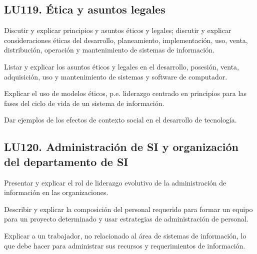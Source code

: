 \subsection{LU119. Ética y asuntos legales}\label{sec:BOK-LU119}\label{sec:LU119}
\begin{LearningUnit}
\begin{LUGoal}
\item Discutir y explicar principios y asuntos éticos y legales; discutir y explicar consideraciones éticas del desarrollo, planeamiento, implementación, uso, venta, distribución, operación y mantenimiento de sistemas de información.
\end{LUGoal}

\begin{LUObjective}
\item Listar y explicar los asuntos éticos y legales en el desarrollo, posesión, venta, adquisición, uso y mantenimiento de sistemas y software de computador.
\item Explicar el uso de modelos éticos, p.e. liderazgo centrado en principios para las fases del ciclo de vida de un sistema de información.
\item Dar ejemplos de los efectos de contexto social en el desarrollo de tecnología.
\end{LUObjective}
\end{LearningUnit}

\subsection{LU120. Administración de SI y organización del departamento de SI}\label{sec:BOK-LU120}\label{sec:LU120}
\begin{LearningUnit}
\begin{LUGoal}
\item Presentar y explicar el rol de liderazgo evolutivo de la administración de información en las organizaciones.
\end{LUGoal}

\begin{LUObjective}
\item Describir y explicar la composición del personal requerido para formar un equipo para un proyecto determinado y usar estrategias de administración de personal.
\item Explicar a un trabajador, no relacionado al área de sistemas de información, lo que debe hacer para administrar sus recursos y requerimientos de información.
\end{LUObjective}
\end{LearningUnit}

